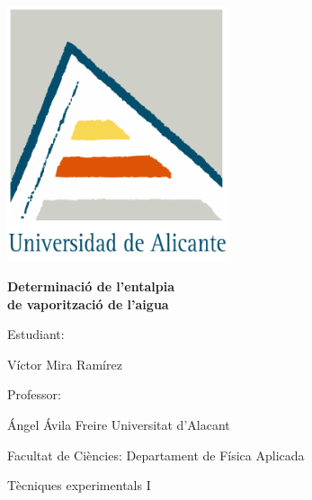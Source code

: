 \documentclass{article}
\newcommand{\titulo}{Determinació de l'entalpia \\de vaporització de l'aigua}
\newcommand{\nombreestudiante}{Víctor Mira Ramírez}
\newcommand{\nombredirector}{Ángel Ávila Freire}
\newcommand{\fecha}{\date{Març 2023}}  %
\begin{document}
\begin{titlepage}
	\centering
	\includegraphics[width=65mm]{fotos/logoUA.png}\par
	\vspace{1cm}
	{\huge\bfseries \vspace{15mm} \titulo \par}
	\vfill
	{\large 
	\vfill
	Estudiant:\par\vspace{2mm}
	\nombreestudiante\par
	\vfill
	Professor:\par\vspace{2mm}
    \nombredirector
    \vfill
    Universitat d'Alacant\par
    Facultat de Ciències: Departament de Física Aplicada\par
    Tècniques experimentals I\par
	\fecha\par}
\end{titlepage}

\pagebreak

\begin{abstract}\label{sec:abstract}
    L'objectiu d'aquest informe es verificar l'equació de Clausius-Clapeyron, determinar experimentalment l'entalpia de vaporització molar de l'aigua i finalment comparar l'obtenció experimental de la temperatura d'ebullició de l'aigua (a pressió atmosfèrica) amb l'equació semi-empírica de Antoine.
\end{abstract}

\vspace{0.3cm}
\tableofcontents
\newpage
\end{document}
